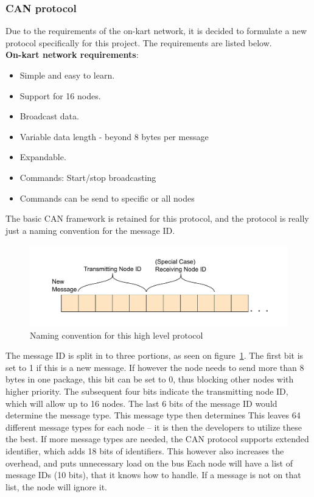 
\subsubsection{CAN protocol}\label{sub:CAN_protocol}
Due to the requirements of the on-kart network, it is decided to formulate a new protocol specifically for this project. The requirements are listed below.\\
\textbf{On-kart network requirements}:
\begin{itemize}
	\item Simple and easy to learn.
	\item Support for 16 nodes.
	\item Broadcast data.
	\item Variable data length - beyond 8 bytes per message
	\item Expandable.
	\item Commands: Start/stop broadcasting 
	\item Commands can be send to specific or all nodes
\end{itemize}

The basic CAN framework is retained for this protocol, and the protocol is really just a naming convention for the message ID. 

\begin{figure}[h!]
	\centering
	\includegraphics[width = 0.9\linewidth]{graphics/CAN_protocol_general_pdf}
	\caption{Naming convention for this high level protocol}
	\label{fig:CAN_protocol_general_pdf}
\end{figure}

The message ID is split in to three portions, as seen on figure~\ref{fig:CAN_protocol_general_pdf}.
The first bit is set to 1 if this is a new message.
If however the node needs to send more than 8 bytes in one package, this bit can be set to 0, thus blocking other nodes with higher priority.
The subsequent four bits indicate the transmitting node ID, which will allow up to 16 nodes. 
The last 6 bits of the message ID would determine the message type.
This message type then determines 
This leaves 64 different message types for each node -- it is then the developers to utilize these the best. 
If more message types are needed, the CAN protocol supports extended identifier, which adds 18 bits of identifiers.
This however also increases the overhead, and puts unnecessary load on the bus
Each node will have a list of message IDs (10 bits), that it knows how to handle.
If a message is not on that list, the node will ignore it.\\

